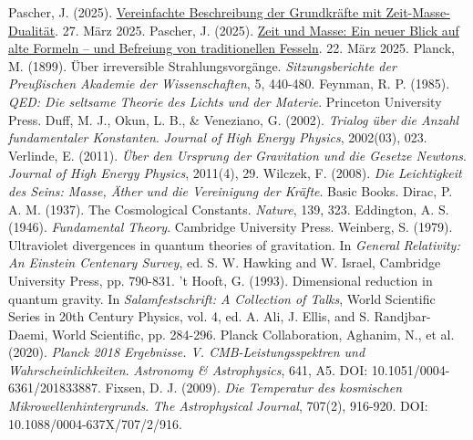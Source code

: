 \documentclass[12pt,a4paper]{article}
\begin{document}
\begin{thebibliography}{99}
		 Pascher, J. (2025). \href{https://github.com/jpascher/T0-Time-Mass-Duality/tree/main/2/pdf/Deutsch/Vereinfachte Beschreibung der vier Grundkräfte mit Zeit-Masse-Dualität.pdf}{Vereinfachte Beschreibung der Grundkräfte mit Zeit-Masse-Dualität}. 27. März 2025.
		 Pascher, J. (2025). \href{https://github.com/jpascher/T0-Time-Mass-Duality/tree/main/2/pdf/Deutsch/Zeit und Masse Ein neuer Blick auf alte Formeln – und die Befreiung von traditionellen Fesseln.pdf}{Zeit und Masse: Ein neuer Blick auf alte Formeln – und Befreiung von traditionellen Fesseln}. 22. März 2025.
		 Planck, M. (1899). Über irreversible Strahlungsvorgänge. \textit{Sitzungsberichte der Preußischen Akademie der Wissenschaften}, 5, 440-480.
		 Feynman, R. P. (1985). \textit{QED: Die seltsame Theorie des Lichts und der Materie}. Princeton University Press.
		 Duff, M. J., Okun, L. B., \& Veneziano, G. (2002). \textit{Trialog über die Anzahl fundamentaler Konstanten}. \textit{Journal of High Energy Physics}, 2002(03), 023.
		 Verlinde, E. (2011). \textit{Über den Ursprung der Gravitation und die Gesetze Newtons}. \textit{Journal of High Energy Physics}, 2011(4), 29.
		 Wilczek, F. (2008). \textit{Die Leichtigkeit des Seins: Masse, Äther und die Vereinigung der Kräfte}. Basic Books.
		 Dirac, P. A. M. (1937). The Cosmological Constants. \textit{Nature}, 139, 323.
		 Eddington, A. S. (1946). \textit{Fundamental Theory}. Cambridge University Press.
		 Weinberg, S. (1979). Ultraviolet divergences in quantum theories of gravitation. In \textit{General Relativity: An Einstein Centenary Survey}, ed. S. W. Hawking and W. Israel, Cambridge University Press, pp. 790-831.
		 't Hooft, G. (1993). Dimensional reduction in quantum gravity. In \textit{Salamfestschrift: A Collection of Talks}, World Scientific Series in 20th Century Physics, vol. 4, ed. A. Ali, J. Ellis, and S. Randjbar-Daemi, World Scientific, pp. 284-296.
		 Planck Collaboration, Aghanim, N., et al. (2020). \textit{Planck 2018 Ergebnisse. V. CMB-Leistungsspektren und Wahrscheinlichkeiten}. \textit{Astronomy \& Astrophysics}, 641, A5. DOI: 10.1051/0004-6361/201833887.
		 Fixsen, D. J. (2009). \textit{Die Temperatur des kosmischen Mikrowellenhintergrunds}. \textit{The Astrophysical Journal}, 707(2), 916-920. DOI: 10.1088/0004-637X/707/2/916.

\end{thebibliography}
\end{document}
